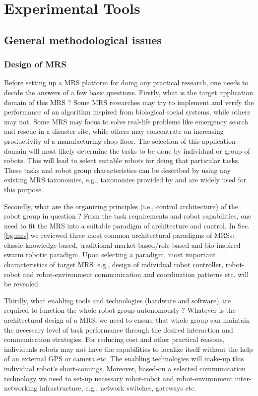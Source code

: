 \chapter{Experimental Tools}
\section{General methodological issues}
\subsection{Design of MRS}
Before setting up a MRS platform for doing any practical research, one needs to decide the answers of  a few basic questions. 
Firstly, what  is the target application domain of this MRS ? Some MRS researches may try to implement and verify the performance of an algorithm inspired from biological social systems, while others may not. Some MRS may focus to solve real-life problems like emergency search and rescue in a disaster site, while others may concentrate on increasing productivity of a manufacturing shop-floor.  The selection of this application domain will most likely determine the tasks to be done by individual or group of robots. This will lead to select suitable robots for doing that particular tasks. These tasks and robot group characteristics can be described by using any existing MRS taxonomies, e.g.,  taxonomies provided by   \cite{Gerkey+2004} and \cite{Dudek+1996} are widely used for this purpose. 

Secondly,  what are the organizing principles (i.e., control architecture) of  the robot group in question ? From the task requirements and robot capabilities,  one need to fit the MRS into a suitable paradigm of architecture and control. In Sec. \ref{bg:mrs} we reviewed three most common architectural paradigms of MRSs: classic knowledge-based, traditional market-based/role-based and bio-inspired swarm robotic paradigm. Upon selecting a paradigm, most important characteristics of target MRS: e.g., design of individual robot controller, robot-robot and robot-environment communication and coordination patterns etc. will be revealed.

Thirdly, what enabling tools and technologies (hardware and software) are required to function the whole robot group autonomously ? Whatever is the architectural design of a MRS, we need to ensure that whole group can maintain the necessary level of task performance through the desired interaction and communication strategies. For reducing cost and other practical reasons, individuals robots may not have the capabilities to localize itself without the help of an external GPS or camera etc. The enabling technologies will make-up this individual robot's short-comings. Moreover, based-on a selected communication technology we need to set-up necessary robot-robot and robot-environment inter-networking infrastructure, e.g., network switches, gateways etc.

